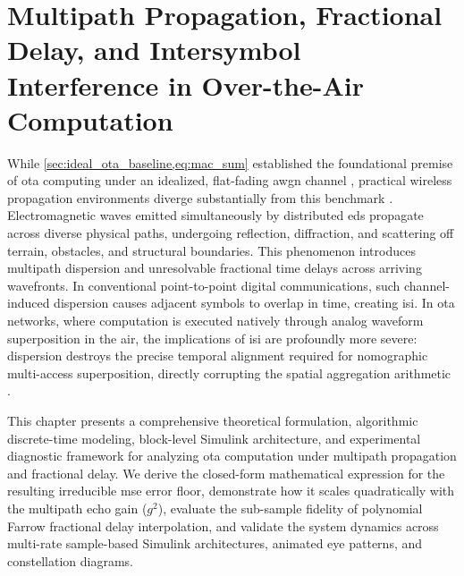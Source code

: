 \documentclass[Markos_Delaportas_1316.tex]{subfiles}
\begin{document}
\section{Multipath Propagation, Fractional Delay, and Intersymbol
Interference in Over-the-Air Computation}
\label{sec:multipath_isi_chapter}
While \cref{sec:ideal_ota_baseline,eq:mac_sum} established the
foundational premise of \gls{ota} computing under
an idealized, flat-fading \gls{awgn} channel
\cite{sahin_survey_2023,nazer_reliable_nodate}, practical wireless
propagation environments diverge substantially
from this benchmark
\cite{perez-neira_waveforms_2025,zhu_over--air_2024}. Electromagnetic
waves emitted simultaneously by
distributed \gls{ed}s propagate across diverse
physical paths, undergoing reflection, diffraction, and scattering
off terrain, obstacles, and structural boundaries.
This phenomenon introduces multipath dispersion and unresolvable
fractional time delays across arriving wavefronts.
In conventional point-to-point digital communications, such
channel-induced dispersion causes adjacent symbols
to overlap in time, creating \gls{isi}. In \gls{ota} networks, where
computation is executed natively through
analog waveform superposition in the air, the implications of
\gls{isi} are profoundly more severe: dispersion
destroys the precise temporal alignment required for nomographic
multi-access superposition, directly corrupting
the spatial aggregation arithmetic
\cite{goldenbaum_robust_2013,goldenbaum_analyzing_2011}.

This chapter presents a comprehensive theoretical formulation,
algorithmic discrete-time modeling, block-level
Simulink architecture, and experimental diagnostic framework for
analyzing \gls{ota} computation under multipath
propagation and fractional delay. We derive the closed-form
mathematical expression for the resulting irreducible
\gls{mse} error floor, demonstrate how it scales quadratically with
the multipath echo gain ($g^2$), evaluate the
sub-sample fidelity of polynomial Farrow fractional delay
interpolation, and validate the system dynamics across
multi-rate sample-based Simulink architectures, animated eye
patterns, and constellation diagrams.
\end{document}
